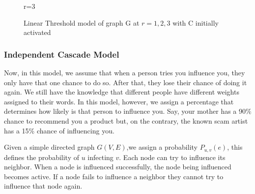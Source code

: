 \begin{figure}[bp!]
\begin{minipage}{0.45\textwidth}
	\caption{r=3}
	\end{minipage}
	\caption{Linear Threshold model of graph G at $r=1,2,3$ with C initially activated}
\label{linearfig}
\end{figure}

\newpage
\subsubsection{Independent Cascade Model}
Now, in this model, we assume that when a person tries you influence you, they only have that one chance to do so. After that, they lose their chance of doing it again. We still have the knowledge that different people have different weights assigned to their words. In this model, however, we assign a percentage that determines how likely is that person to influence you. Say, your mother has a 90\% chance to recommend you a product but, on the contrary, the known scam artist has a 15\% chance of influencing you.

Given a simple directed graph $G(V,E)$,we assign a probability $P_{u,v}(e)$, this defines the probability of $u$ infecting $v$. Each node can try to influence its neighbor. When a node is influenced successfully, the node being influenced becomes active. If a node fails to influence a neighbor they cannot try to influence that node again.\cite{Kempe}\cite{Shakarian:2012:LSN:2456719.2457081}

